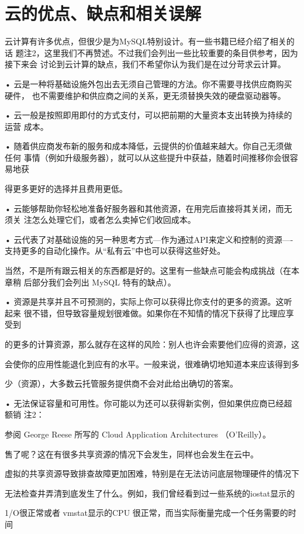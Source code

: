\section{云的优点、缺点和相关误解}
云计算有许多优点，但很少是为MySQL特别设计。有一些书籍已经介绍了相关的话
题注2，这里我们不再赞述。不过我们会列出一些比较重要的条目供参考，因为接下来会
讨论到云计算的缺点，我们不希望你认为我们是在过分苛求云计算。

• 云是一种将基础设施外包出去无须自己管理的方法。你不需要寻找供应商购买硬件，
也不需要维护和供应商之间的关系，更无须替换失效的硬盘驱动器等。

• 云一般是按照即用即付的方式支付，可以把前期的大量资本支出转换为持续的运营
成本。

• 随着供应商发布新的服务和成本降低，云提供的价值越来越大。你自己无须做任何
事情（例如升级服务器），就可以从这些提升中获益，随着时间推移你会很容易地获

得更多更好的选择并且费用更低。

• 云能够帮助你轻松地准备好服务器和其他资源，在用完后直接将其关闭，而无须关
注怎么处理它们，或者怎么卖掉它们收回成本。

• 云代表了对基础设施的另一种思考方式—作为通过API来定义和控制的资源—-
支持更多的自动化操作。从“私有云”中也可以获得这些好处。

当然，不是所有跟云相关的东西都是好的。这里有一些缺点可能会构成挑战（在本章稍
后部分我们会列出 MySQL 特有的缺点）。

• 资源是共享并且不可预测的，实际上你可以获得比你支付的更多的资源。这听起来
很不错，但导致容量规划很难做。如果你在不知情的情况下获得了比理应享受到

的更多的计算资源，那么就存在这样的风险：别人也许会索要他们应得的资源，这

会使你的应用性能退化到应有的水平。一般来说，很难确切地知道本来应该得到多

少（资源），大多数云托管服务提供商不会对此给出确切的答案。

• 无法保证容量和可用性。你可能以为还可以获得新实例，但如果供应商已经超额销
注2：

参阅 George Reese 所写的 Cloud Application Architectures （O'Reilly）。

售了呢？这在有很多共享资源的情况下会发生，同样也会发生在云中。

虚拟的共享资源导致排查故障更加困难，特别是在无法访问底层物理硬件的情况下

无法检查井弄清到底发生了什么。例如，我们曾经看到过一些系统的iostat显示的

1/O很正常或者 vmstat显示的CPU 很正常，而当实际衡量完成一个任务需要的时间


